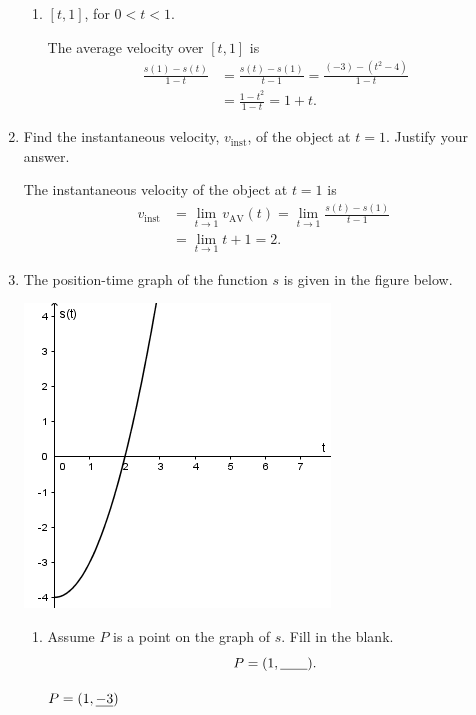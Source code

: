 \documentclass[nooutcomes, handout]{ximera}
\begin{document}
\begin{problem}
\begin{enumerate}
\begin{enumerate}
\item
$[t, 1]$, for $0 < t < 1$.
\begin{freeResponse}
The average velocity over $[t, 1]$ is
\begin{align*}
\frac{s(1) - s(t)}{1-t} &= \frac{s(t) - s(1)}{t-1}=\frac{(-3) - (t^2-4)}{1-t}\\
&= \frac{1-t^2}{1-t} = 1+t.
\end{align*}
\end{freeResponse}
\end{enumerate}

\item 
Find the instantaneous velocity, $v_{\mathrm{inst}}$, of the object at $t = 1$.
Justify your answer.
\begin{freeResponse}
The instantaneous velocity of the object at $t = 1$ is
\begin{align*}
v_{\mathrm{inst}} &=\lim_{t \to 1}v_{\mathrm{AV}}(t)= \lim_{t \to 1} \frac{s(t) - s(1)}{t-1} \\
&= \lim_{t \to 1} t+1 = 2.
\end{align*}
\end{freeResponse}


\item
The position-time graph of the function $s$ is given in the figure below.
\begin{image}
\includegraphics[scale = .7]{Figure10.png}
\end{image}
\begin{enumerate}
\item
Assume $P$ is a point on the graph of $s$.
Fill in the blank.
\[
P = (1, \mbox{\underline{\hspace{2em}}}).
\]
\begin{freeResponse}
$P = (1, \mbox{\underline{$-3$}})$
\end{freeResponse}



\end{enumerate}
\end{enumerate}
\end{problem}
\end{document}
